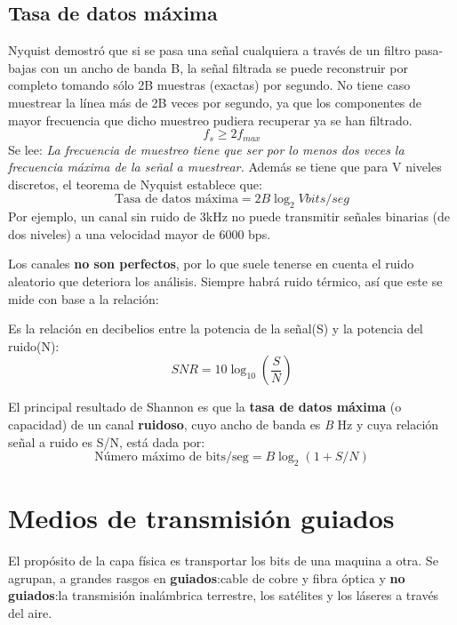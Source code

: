 \documentclass[
	12pt, %
	fleqn, %
	a4paper, %
]{LegrandOrangeBook}
\begin{document}
\subsection{Tasa de datos máxima}
\begin{definition}
Nyquist demostró que si se pasa una señal cualquiera a través de un filtro pasa-bajas con un ancho de banda B, la señal filtrada se puede reconstruir por completo tomando sólo 2B muestras (exactas) por segundo. No tiene caso muestrear la línea más de 2B veces por segundo, ya que los componentes de mayor frecuencia que dicho muestreo pudiera recuperar ya se han filtrado.
\begin{equation}
\label{eq:teorema de nyquist}
f_{s}\geq 2f_{max}
\end{equation}
Se lee: \textit{La frecuencia de muestreo tiene que ser por lo menos dos veces la frecuencia máxima de la señal a muestrear.}
Además se tiene que para V niveles discretos, el teorema de Nyquist establece que:
\begin{equation}
\label{nyquist niveles}
\text{Tasa de datos máxima}=2B\log_2Vbits/seg
\end{equation}
Por ejemplo, un canal sin ruido de 3kHz no puede transmitir señales binarias (de dos niveles) a una velocidad mayor de 6000 bps.
\end{definition}
Los canales \textbf{no son perfectos}, por lo que suele tenerse en cuenta el ruido aleatorio que deteriora los análisis. Siempre habrá ruido térmico, así que este se mide con base a la relación:
\begin{definition}
Es la relación en decibelios entre la potencia de la señal(S) y la potencia del ruido(N):
\begin{equation}
\label{eq:snr}
SNR=10\log_{10}\left(\frac{S}{N}\right)
\end{equation}
\end{definition}
\begin{definition}
El principal resultado de Shannon es que la \textbf{tasa de datos máxima} (o capacidad) de un canal \textbf{ruidoso}, cuyo ancho de banda es \textit{B} Hz y cuya relación señal a ruido es S/N, está dada por:
\begin{equation}
\text{Número máximo de bits/seg}=B\log_2(1+S/N)
\end{equation}
\end{definition}
\section{Medios de transmisión guiados}
El propósito de la capa física es transportar los bits de una maquina a otra. Se agrupan, a grandes rasgos en \textbf{guiados}:cable de cobre y fibra óptica y \textbf{no guiados}:la transmisión inalámbrica terrestre, los satélites y los láseres a través del aire.
\end{document}

